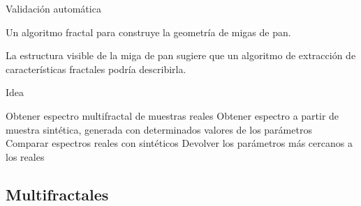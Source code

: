 \documentclass[spanish,unknownkeysallowed]{beamer}
\begin{document}
\begin{frame}{Validación automática}

Un algoritmo fractal para construye la geometría de migas de pan.

La estructura visible de la miga de pan sugiere que un algoritmo de extracción de características fractales podría describirla.


\end{frame}

\begin{frame}{Idea}
\begin{algorithm}[H]
\begin{algorithmic}[1]
\STATE Obtener espectro multifractal de muestras reales
\STATE Obtener espectro a partir de muestra sintética, generada con determinados valores de los parámetros
\STATE Comparar espectros reales con sintéticos
\ENDFOR
\STATE Devolver los parámetros más cercanos a los reales
\end{algorithmic}
\end{algorithm}
\end{frame}


\subsection{Multifractales}






\end{document}
